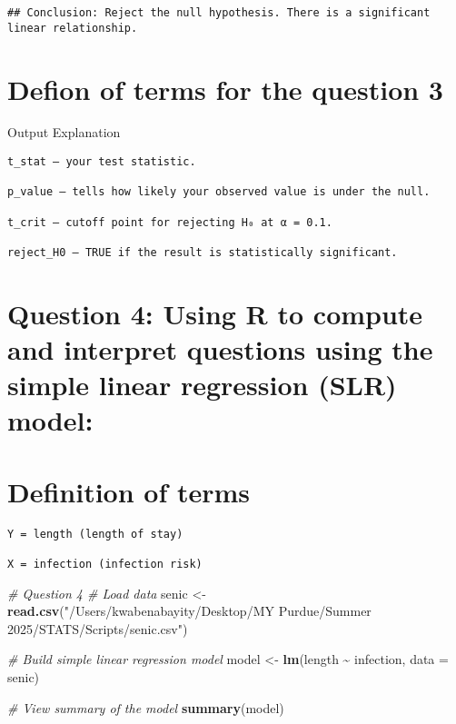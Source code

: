\documentclass[
]{article}
\newenvironment{Shaded}{\begin{snugshade}}{\end{snugshade}}
\newcommand{\AttributeTok}[1]{\textcolor[rgb]{0.13,0.29,0.53}{#1}}
\newcommand{\CommentTok}[1]{\textcolor[rgb]{0.56,0.35,0.01}{\textit{#1}}}
\newcommand{\FunctionTok}[1]{\textcolor[rgb]{0.13,0.29,0.53}{\textbf{#1}}}
\newcommand{\NormalTok}[1]{#1}
\newcommand{\OtherTok}[1]{\textcolor[rgb]{0.56,0.35,0.01}{#1}}
\newcommand{\SpecialCharTok}[1]{\textcolor[rgb]{0.81,0.36,0.00}{\textbf{#1}}}
\newcommand{\StringTok}[1]{\textcolor[rgb]{0.31,0.60,0.02}{#1}}
\begin{document}
\begin{verbatim}
## Conclusion: Reject the null hypothesis. There is a significant linear relationship.
\end{verbatim}

\section{Defion of terms for the question
3}\label{defion-of-terms-for-the-question-3}

Output Explanation

\begin{verbatim}
t_stat — your test statistic.

p_value — tells how likely your observed value is under the null.

t_crit — cutoff point for rejecting H₀ at α = 0.1.

reject_H0 — TRUE if the result is statistically significant.
\end{verbatim}

\section{Question 4: Using R to compute and interpret questions using
the simple linear regression (SLR)
model:}\label{question-4-using-r-to-compute-and-interpret-questions-using-the-simple-linear-regression-slr-model}

\section{Definition of terms}\label{definition-of-terms}

\begin{verbatim}
Y = length (length of stay)

X = infection (infection risk)
\end{verbatim}

\begin{Shaded}
\begin{Highlighting}[]
\CommentTok{\# Question 4 \# Load data}
\NormalTok{senic }\OtherTok{\textless{}{-}} \FunctionTok{read.csv}\NormalTok{(}\StringTok{"/Users/kwabenabayity/Desktop/MY Purdue/Summer 2025/STATS/Scripts/senic.csv"}\NormalTok{)}

\CommentTok{\# Build simple linear regression model}
\NormalTok{model }\OtherTok{\textless{}{-}} \FunctionTok{lm}\NormalTok{(length }\SpecialCharTok{\textasciitilde{}}\NormalTok{ infection, }\AttributeTok{data =}\NormalTok{ senic)}

\CommentTok{\# View summary of the model}
\FunctionTok{summary}\NormalTok{(model)}
\end{Highlighting}
\end{Shaded}
\end{document}

